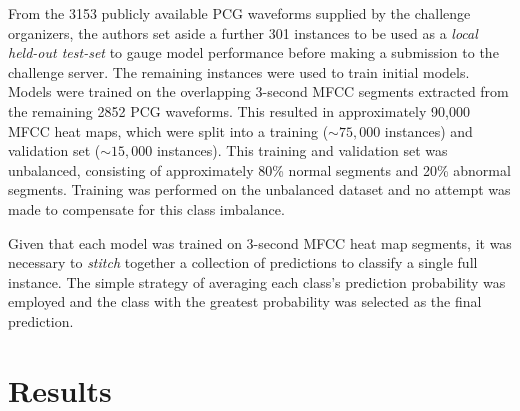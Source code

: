 \documentclass{article}
\begin{document}
From the 3153 publicly available PCG waveforms supplied by the challenge organizers, the authors set aside a further 301 instances to be used as a \emph{local held-out test-set} to gauge model performance before making a submission to the challenge server. The remaining instances were used to train initial models. Models were trained on the overlapping 3-second MFCC segments extracted from the remaining 2852 PCG waveforms. This resulted in approximately 90,000 MFCC heat maps, which were split into a training ($\sim75,000$ instances) and validation set ($\sim15,000$ instances). This training and validation set was unbalanced, consisting of approximately 80\% normal segments and 20\% abnormal segments. Training was performed on the unbalanced dataset and no attempt was made to compensate for this class imbalance.

Given that each model was trained on 3-second MFCC heat map segments, it was necessary to \emph{stitch} together a collection of predictions to classify a single full instance. The simple strategy of averaging each class's prediction probability was employed and the class with the greatest probability was selected as the final prediction.



\section{Results}
\label{sec:results}
\end{document}
